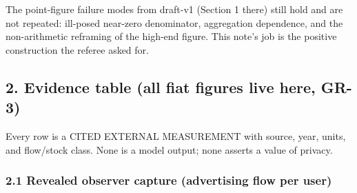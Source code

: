 \documentclass[
  11pt,
]{article}
\newcounter{none} %
\begin{document}
The point-figure failure modes from draft-v1 (Section 1 there) still
hold and are not repeated: ill-posed near-zero denominator, aggregation
dependence, and the non-arithmetic reframing of the high-end figure.
This note's job is the positive construction the referee asked for.

\subsection{2. Evidence table (all fiat figures live here,
GR-3)}\label{evidence-table-all-fiat-figures-live-here-gr-3}

Every row is a CITED EXTERNAL MEASUREMENT with source, year, units, and
flow/stock class. None is a model output; none asserts a value of
privacy.

\subsubsection{2.1 Revealed observer capture (advertising flow per
user)}\label{revealed-observer-capture-advertising-flow-per-user}
\end{document}

